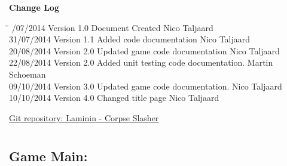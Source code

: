 \documentclass[letterpaper]{article}
\begin{document}

	\newpage
		{\LARGE \bf Change Log}\\[2em]
		
		\begin{tabbing}
			\hspace*{2.5cm}\=\hspace*{2.5cm}\=\hspace*{8cm}\=\hspace*{3cm} /07/2014	\> Version 1.0	\> Document Created 							\> Nico Taljaard \\
			31/07/2014  \> Version 1.1  \> Added code documentation						\> Nico Taljaard\\
			20/08/2014  \> Version 2.0  \> Updated game code documentation				\> Nico Taljaard\\
			22/08/2014  \> Version 2.0  \> Added unit testing code documentation.		\> Martin Schoeman\\
			09/10/2014	\> Version 3.0	\> Updated game code documentation.				\> Nico Taljaard\\
			10/10/2014	\> Version 4.0	\> Changed title page							\> Nico Taljaard\\
		\end{tabbing}
		
	\newpage
		\renewcommand\contentsname{TABLE OF CONTENTS}
		\newcommand\contentsnameLC{\colorbox{black}{\makebox[\textwidth-2\fboxsep][l]{\bfseries\color{red} Table of Contents}}}
		
		\renewcommand{\cftdot}{}
		\hypersetup{linktocpage}
		\tableofcontents
		
		\begin{flushleft}
			\LARGE\href{https://github.com/njTaljaard/Laminin_CorpseSlasher/}{Git repository: Laminin - Corpse Slasher}
		\end{flushleft}
		
		\newpage
		
		\section*{\colorbox{black}{}} 
				\vspace{0.1in}
				
					\subsection*{Game Main:}
					\vspace{0.1in}
						
\end{document}
